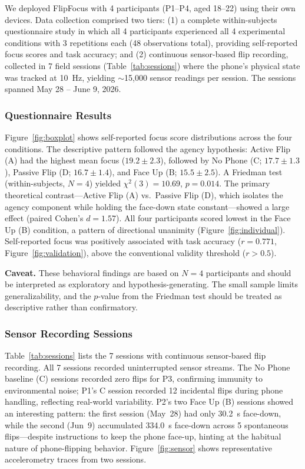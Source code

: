 \documentclass[sigconf]{acmart}
\begin{document}
We deployed FlipFocus with 4 participants (P1--P4, aged 18--22) using their own devices. Data collection comprised two tiers: (1) a complete within-subjects questionnaire study in which all 4 participants experienced all 4 experimental conditions with 3 repetitions each (48 observations total), providing self-reported focus scores and task accuracy; and (2) continuous sensor-based flip recording, collected in 7 field sessions (Table~\ref{tab:sessions}) where the phone's physical state was tracked at 10~Hz, yielding $\sim$15,000 sensor readings per session. The sessions spanned May 28 -- June 9, 2026.

\subsubsection{Questionnaire Results}

Figure~\ref{fig:boxplot} shows self-reported focus score distributions across the four conditions. The descriptive pattern followed the agency hypothesis: Active Flip (A) had the highest mean focus ($19.2 \pm 2.3$), followed by No Phone (C; $17.7 \pm 1.3$), Passive Flip (D; $16.7 \pm 1.4$), and Face Up (B; $15.5 \pm 2.5$). A Friedman test (within-subjects, $N=4$) yielded $\chi^2(3) = 10.69$, $p = 0.014$. The primary theoretical contrast---Active Flip (A) vs.\ Passive Flip (D), which isolates the agency component while holding the face-down state constant---showed a large effect (paired Cohen's $d = 1.57$). All four participants scored lowest in the Face Up (B) condition, a pattern of directional unanimity (Figure~\ref{fig:individual}). Self-reported focus was positively associated with task accuracy ($r = 0.771$, Figure~\ref{fig:validation}), above the conventional validity threshold ($r > 0.5$).

\textbf{Caveat.} These behavioral findings are based on $N=4$ participants and should be interpreted as exploratory and hypothesis-generating. The small sample limits generalizability, and the $p$-value from the Friedman test should be treated as descriptive rather than confirmatory.

\subsubsection{Sensor Recording Sessions}

Table~\ref{tab:sessions} lists the 7 sessions with continuous sensor-based flip recording. All 7 sessions recorded uninterrupted sensor streams. The No Phone baseline (C) sessions recorded zero flips for P3, confirming immunity to environmental noise; P1's C session recorded 12 incidental flips during phone handling, reflecting real-world variability. P2's two Face Up (B) sessions showed an interesting pattern: the first session (May~28) had only 30.2~s face-down, while the second (Jun~9) accumulated 334.0~s face-down across 5 spontaneous flips---despite instructions to keep the phone face-up, hinting at the habitual nature of phone-flipping behavior. Figure~\ref{fig:sensor} shows representative accelerometry traces from two sessions.
\end{document}
